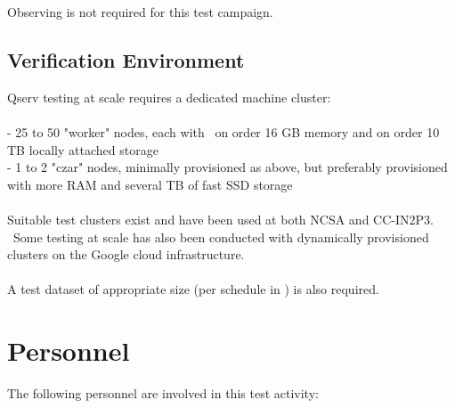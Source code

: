 \documentclass[DM,lsstdraft,STR,toc]{lsstdoc}
\begin{document}
  Observing is not required for this test campaign.

\subsection{Verification Environment}
\label{sect:hwconf}
  Qserv testing at scale requires a dedicated machine cluster:\\
~\\
- 25 to 50 "worker" nodes, each with ~on order 16 GB memory and on order
10 TB locally attached storage\\
- 1 to 2 "czar" nodes, minimally provisioned as above, but preferably
provisioned with more RAM and several TB of fast SSD storage\\
~\\
Suitable test clusters exist and have been used at both NCSA and
CC-IN2P3. ~Some testing at scale has also been conducted with
dynamically provisioned clusters on the Google cloud infrastructure.\\
~\\
A test dataset of appropriate size (per schedule in ) is also
required.





\section{Personnel}
\label{sect:personnel}

The following personnel are involved in this test activity:
\end{document}

